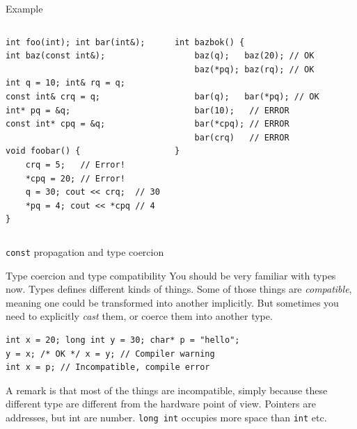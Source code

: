 \begin{frame}[fragile]{Example}
\begin{columns}
\begin{verbatim}
int foo(int); int bar(int&);
int baz(const int&);

int q = 10; int& rq = q;
const int& crq = q;
int* pq = &q; 
const int* cpq = &q;

void foobar() {
    crq = 5;   // Error!
    *cpq = 20; // Error!
    q = 30; cout << crq;  // 30
    *pq = 4; cout << *cpq // 4
}
\end{verbatim}
\begin{verbatim}
int bazbok() {
    baz(q);   baz(20); // OK
    baz(*pq); baz(rq); // OK
	
    bar(q);   bar(*pq); // OK
    bar(10);   // ERROR
    bar(*cpq); // ERROR
    bar(crq)   // ERROR
}
\end{verbatim}
\end{columns}
\end{frame}

\begin{frame}[fragile]{\texttt{const} propagation and type coercion}

\begin{block}{Type coercion and type compatibility}
	You should be very familiar with types now. Types defines different kinds of things. Some of those things are \textit{compatible}, meaning one could be transformed into another implicitly. But sometimes you need to explicitly \textit{cast} them, or coerce them into another type.
		
\begin{verbatim}
int x = 20; long int y = 30; char* p = "hello";
y = x; /* OK */ x = y; // Compiler warning
int x = p; // Incompatible, compile error
\end{verbatim} 
\end{block}

	A remark is that most of the things are incompatible, simply because these different type are different from the hardware point of view. Pointers are addresses, but int are number. \texttt{long int} occupies more space than \texttt{int} etc.
	
\end{frame}

